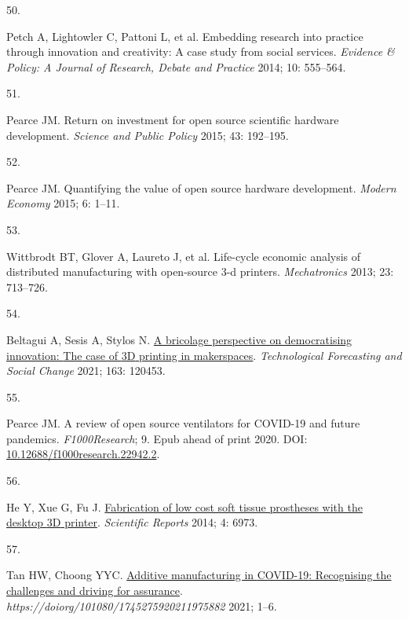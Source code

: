 \documentclass[
  11pt,
  a4paperpaper,
  onecolumn]{article}
\newlength{\cslhangindent}
\newlength{\csllabelwidth}
\newlength{\cslentryspacingunit} %
\newenvironment{CSLReferences}[2] %
 {%
  \setlength{\parindent}{0pt}
  \ifodd #1
  \let\oldpar\par
  \def\par{\hangindent=\cslhangindent\oldpar}
  \fi
  \setlength{\parskip}{#2\cslentryspacingunit}
 }%
 {}
\newcommand{\CSLLeftMargin}[1]{\parbox[t]{\csllabelwidth}{#1}}
\newcommand{\CSLRightInline}[1]{\parbox[t]{\linewidth - \csllabelwidth}{#1}\break}
\begin{document}
\begin{CSLReferences}{0}{0}
\leavevmode{}%
\CSLLeftMargin{50. }%
\CSLRightInline{Petch A, Lightowler C, Pattoni L, et al. Embedding
research into practice through innovation and creativity: A case study
from social services. \emph{Evidence \& Policy: A Journal of Research,
Debate and Practice} 2014; 10: 555--564.}

\leavevmode{}%
\CSLLeftMargin{51. }%
\CSLRightInline{Pearce JM. Return on investment for open source
scientific hardware development. \emph{Science and Public Policy} 2015;
43: 192--195.}

\leavevmode{}%
\CSLLeftMargin{52. }%
\CSLRightInline{Pearce JM. Quantifying the value of open source hardware
development. \emph{Modern Economy} 2015; 6: 1--11.}

\leavevmode{}%
\CSLLeftMargin{53. }%
\CSLRightInline{Wittbrodt BT, Glover A, Laureto J, et al. Life-cycle
economic analysis of distributed manufacturing with open-source 3-d
printers. \emph{Mechatronics} 2013; 23: 713--726.}

\leavevmode{}%
\CSLLeftMargin{54. }%
\CSLRightInline{Beltagui A, Sesis A, Stylos N.
\href{https://doi.org/10.1016/j.techfore.2020.120453}{A bricolage
perspective on democratising innovation: {The} case of {3D} printing in
makerspaces}. \emph{Technological Forecasting and Social Change} 2021;
163: 120453.}

\leavevmode{}%
\CSLLeftMargin{55. }%
\CSLRightInline{Pearce JM. A review of open source ventilators for
{COVID-19} and future pandemics. \emph{F1000Research}; 9. Epub ahead of
print 2020. DOI:
\href{https://doi.org/10.12688/f1000research.22942.2}{10.12688/f1000research.22942.2}.}

\leavevmode{}%
\CSLLeftMargin{56. }%
\CSLRightInline{He Y, Xue G, Fu J.
\href{https://doi.org/10.1038/srep06973}{Fabrication of low cost soft
tissue prostheses with the desktop {3D} printer}. \emph{Scientific
Reports} 2014; 4: 6973.}

\leavevmode{}%
\CSLLeftMargin{57. }%
\CSLRightInline{Tan HW, Choong YYC.
\href{https://doi.org/10.1080/17452759.2021.1975882}{Additive
manufacturing in {COVID-19}: Recognising the challenges and driving for
assurance}. \emph{https://doiorg/101080/1745275920211975882} 2021;
1--6.}


\end{CSLReferences}
\end{document}
